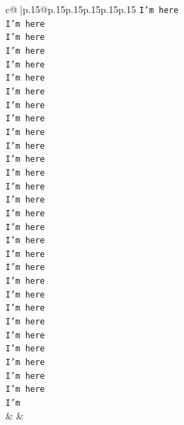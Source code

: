 \documentclass{article}
\begin{document}
{\begin{supertabular}{c@{$\;$}|p{.15\linewidth}@{}p{.15\linewidth}p{.15\linewidth}p{.15\linewidth}p{.15\linewidth}p{.15\linewidth}}
{{{\texttt{I'm here} \\
\texttt{I'm here} \\
\texttt{I'm here} \\
\texttt{I'm here} \\
\texttt{I'm here} \\
\texttt{I'm here} \\
\texttt{I'm here} \\
\texttt{I'm here} \\
\texttt{I'm here} \\
\texttt{I'm here} \\
\texttt{I'm here} \\
\texttt{I'm here} \\
\texttt{I'm here} \\
\texttt{I'm here} \\
\texttt{I'm here} \\
\texttt{I'm here} \\
\texttt{I'm here} \\
\texttt{I'm here} \\
\texttt{I'm here} \\
\texttt{I'm here} \\
\texttt{I'm here} \\
\texttt{I'm here} \\
\texttt{I'm here} \\
\texttt{I'm here} \\
\texttt{I'm here} \\
\texttt{I'm here} \\
\texttt{I'm here} \\
\texttt{I'm here} \\
\texttt{I'm here} \\
\texttt{I'm} \\
            }
        }
    }
    & & \\ \\


\end{supertabular}}
\end{document}
